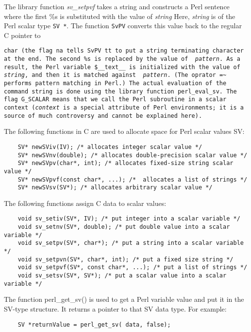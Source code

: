 \documentclass{article}
\begin{document}
The library function {\em sv\_setpvf\/} takes a string and constructs a
Perl sentence where the first \%s is substituted with the value of {\em
  string\/} Here, {\em string\/} is of the Perl scalar type \verb|SV *|.
The function {\tt SvPV} converts this value back to the regular C pointer
to {\tt char (the flag {\tt na} tells SvPV tt to put a string terminating
  character at the end. The second \%s is replaced by the value of {\em
    pattern}.  As a result, the Perl variable \$\_\_text\_\_ is initialized
  with the value of {\em string\/}, and then it is matched against {\em
    pattern}. (The oprator \verb|=~| performs pattern matching in Perl.)
  The actual evaluation of the command string is done using the library
  function {\tt perl\_eval\_sv}.  The flag {G\_SCALAR} means that we call
  the Perl subroutine in a scalar context ({\em context\/} is a special
  attribute of Perl environments; it is a source of much controversy and
  cannot be explained here).


  
\noindent
The following functions in C are used to allocate space for Perl scalar
values SV:

\begin{verbatim}
    SV* newSViv(IV); /* allocates integer scalar value */
    SV* newSVnv(double); /* allocates double-precision scalar value */
    SV* newSVpv(char*, int); /* allocates fixed-size string scalar value */
    SV* newSVpvf(const char*, ...); /*  allocates a list of strings */
    SV* newSVsv(SV*); /* allocates arbitrary scalar value */
\end{verbatim}


\noindent
The following functions assign C data to scalar values:

\begin{verbatim}
    void sv_setiv(SV*, IV); /* put integer into a scalar variable */
    void sv_setnv(SV*, double); /* put double value into a scalar variable */
    void sv_setpv(SV*, char*); /* put a string into a scalar variable */
    void sv_setpvn(SV*, char*, int); /* put a fixed size string */
    void sv_setpvf(SV*, const char*, ...); /* put a list of strings */
    void sv_setsv(SV*, SV*); /* put a scalar value into a scalar variable */
\end{verbatim}


The function
perl{\_}get{\_}sv() is used to get a Perl variable value and put it in the
SV-type structure. It returns a pointer to that SV data type. For
example:

\begin{verbatim}
    SV *returnValue = perl_get_sv( data, false);
\end{verbatim}

}
\end{document}
